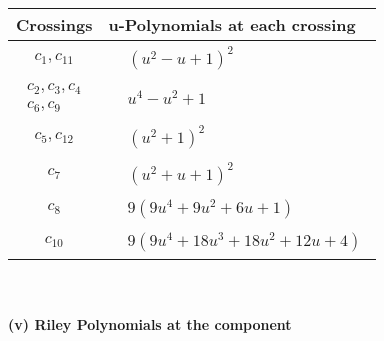 \documentclass[1p]{elsarticle_modified}
\theoremstyle{definition}
\begin{document}
\begin{tabular}{m{50pt}|m{274pt}}
Crossings & \hspace{64pt}u-Polynomials at each crossing \\
\hline $$\begin{aligned}c_{1},c_{11}\end{aligned}$$&$\begin{aligned}
&(u^2- u+1)^2
\end{aligned}$\\
\hline $$\begin{aligned}c_{2},c_{3},c_{4}\\c_{6},c_{9}\end{aligned}$$&$\begin{aligned}
&u^4- u^2+1
\end{aligned}$\\
\hline $$\begin{aligned}c_{5},c_{12}\end{aligned}$$&$\begin{aligned}
&(u^2+1)^2
\end{aligned}$\\
\hline $$\begin{aligned}c_{7}\end{aligned}$$&$\begin{aligned}
&(u^2+u+1)^2
\end{aligned}$\\
\hline $$\begin{aligned}c_{8}\end{aligned}$$&$\begin{aligned}
&9(9 u^4+9 u^2+6 u+1)
\end{aligned}$\\
\hline $$\begin{aligned}c_{10}\end{aligned}$$&$\begin{aligned}
&9(9 u^4+18 u^3+18 u^2+12 u+4)
\end{aligned}$\\
\hline
\end{tabular}\\~\\
\newpage\renewcommand{\arraystretch}{1}
\flushleft \textbf{(v) Riley Polynomials at the component}\newline \\
\end{document}
